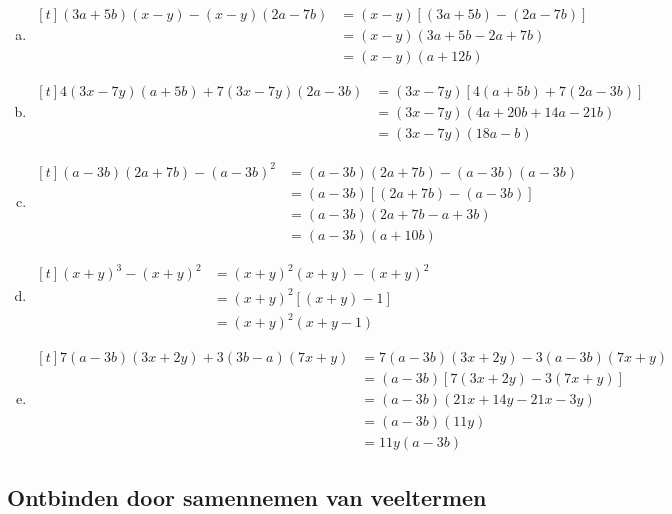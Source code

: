 \documentclass[12pt]{article}
\begin{document}
\begin{solution}
\vspace{-2\topsep}
\begin{enumerate}[(a)]
  \item $\begin{aligned}[t](3a + 5b) (x - y) - (x - y) (2a - 7b)
  &= (x - y) [(3a + 5b) - (2a - 7b)]\\
  &= (x - y) (3a + 5b - 2a + 7b)\\
	&= (x - y) (a + 12b)\end{aligned}$
  \item $\begin{aligned}[t]4 (3x - 7y) (a + 5b) + 7 (3x - 7y) (2a - 3b)
  &= (3x - 7y) [4 (a + 5b) + 7 (2a - 3b)]\\
	&= (3x - 7y) (4a + 20b + 14a - 21b)\\
	&= (3x - 7y) (18a - b)\end{aligned}$
  \item $\begin{aligned}[t](a - 3b) (2a + 7b) - (a - 3b)^2
  &= (a - 3b) (2a + 7b) - (a - 3b)(a - 3b)\\
	&= (a - 3b) [(2a + 7b) - (a - 3b)]\\
	&= (a - 3b) (2a + 7b - a + 3b)\\
	&= (a - 3b) (a + 10b)\end{aligned}$
  \item $\begin{aligned}[t](x + y)^3 - (x + y)^2
  &= (x + y)^2 (x + y) - (x + y)^2\\
	&= (x + y)^2 [(x + y) - 1]\\
	&= (x + y)^2 (x + y - 1)\end{aligned}$
  \item $\begin{aligned}[t]7 (a - 3b) (3x + 2y) + 3 (3b - a) (7x + y)
  &= 7 (a - 3b) (3x + 2y) - 3 (a - 3b) (7x + y)\\
	&= (a - 3b) [7 (3x + 2y) - 3 (7x + y)]\\
	&= (a - 3b) (21 x + 14y - 21 x - 3y)\\
	&= (a - 3b) (11y)\\
	&= 11y (a - 3b)\end{aligned}$
\end{enumerate}
\end{solution}

\subsection{Ontbinden door samennemen van veeltermen}
\end{document}
